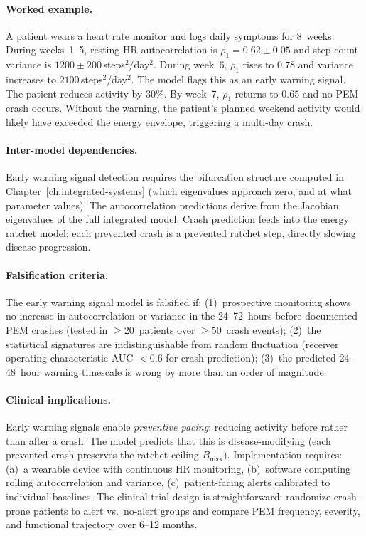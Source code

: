 \paragraph{Worked example.}
A patient wears a heart rate monitor and logs daily symptoms for 8~weeks. During weeks~1--5, resting HR autocorrelation is $\rho_1 = 0.62 \pm 0.05$ and step-count variance is $1200 \pm 200$\,steps$^2$/day$^2$. During week~6, $\rho_1$ rises to $0.78$ and variance increases to $2100$\,steps$^2$/day$^2$. The model flags this as an early warning signal. The patient reduces activity by 30\%. By week~7, $\rho_1$ returns to $0.65$ and no PEM crash occurs. Without the warning, the patient's planned weekend activity would likely have exceeded the energy envelope, triggering a multi-day crash.

\paragraph{Inter-model dependencies.}
Early warning signal detection requires the bifurcation structure computed in Chapter~\ref{ch:integrated-systems} (which eigenvalues approach zero, and at what parameter values). The autocorrelation predictions derive from the Jacobian eigenvalues of the full integrated model. Crash prediction feeds into the energy ratchet model: each prevented crash is a prevented ratchet step, directly slowing disease progression.

\paragraph{Falsification criteria.}
The early warning signal model is falsified if: (1)~prospective monitoring shows no increase in autocorrelation or variance in the 24--72~hours before documented PEM crashes (tested in $\geq 20$~patients over $\geq 50$~crash events); (2)~the statistical signatures are indistinguishable from random fluctuation (receiver operating characteristic AUC $< 0.6$ for crash prediction); (3)~the predicted 24--48~hour warning timescale is wrong by more than an order of magnitude.

\paragraph{Clinical implications.}
Early warning signals enable \emph{preventive pacing}: reducing activity before rather than after a crash. The model predicts that this is disease-modifying (each prevented crash preserves the ratchet ceiling $B_{\max}$). Implementation requires: (a)~a wearable device with continuous HR monitoring, (b)~software computing rolling autocorrelation and variance, (c)~patient-facing alerts calibrated to individual baselines. The clinical trial design is straightforward: randomize crash-prone patients to alert vs.\ no-alert groups and compare PEM frequency, severity, and functional trajectory over 6--12 months.

